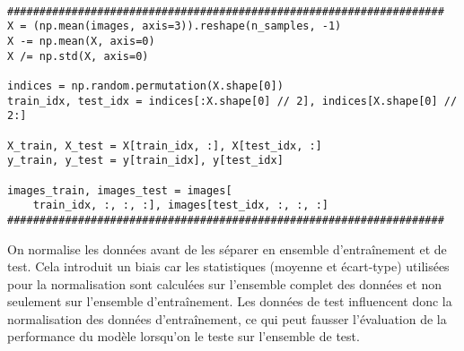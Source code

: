 \documentclass[a4paper, 12pt]{article}
\begin{document}
\begin{verbatim}

####################################################################
X = (np.mean(images, axis=3)).reshape(n_samples, -1)
X -= np.mean(X, axis=0)
X /= np.std(X, axis=0)

indices = np.random.permutation(X.shape[0])
train_idx, test_idx = indices[:X.shape[0] // 2], indices[X.shape[0] // 2:]

X_train, X_test = X[train_idx, :], X[test_idx, :]
y_train, y_test = y[train_idx], y[test_idx]

images_train, images_test = images[
    train_idx, :, :, :], images[test_idx, :, :, :]
####################################################################
\end{verbatim}

On normalise les données avant de les séparer en ensemble d'entraînement et de test. Cela introduit un biais car les statistiques (moyenne et écart-type) utilisées pour la normalisation sont calculées sur l'ensemble complet des données et non seulement sur l'ensemble d'entraînement.
Les données de test influencent donc la normalisation des données d'entraînement, ce qui peut fausser l'évaluation de la performance du modèle lorsqu'on le teste sur l'ensemble de test.
\end{document}
